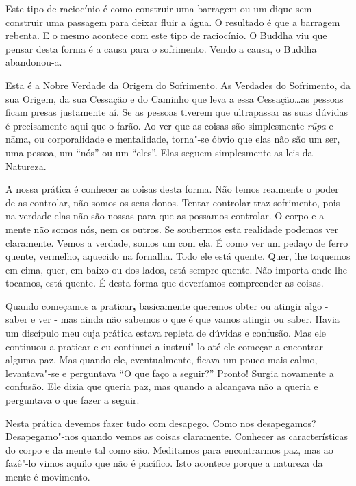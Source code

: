 Este tipo de raciocínio é como construir uma barragem ou um dique sem
construir uma passagem para deixar fluir a água. O resultado é que a
barragem rebenta. E o mesmo acontece com este tipo de raciocínio. O
Buddha viu que pensar desta forma é a causa para o sofrimento. Vendo a
causa, o Buddha abandonou-a.

Esta é a Nobre Verdade da Origem do Sofrimento. As Verdades do
Sofrimento, da sua Origem, da sua Cessação e do Caminho que leva a essa
Cessação\ldots{}as pessoas ficam presas justamente aí. Se as pessoas
tiverem que ultrapassar as suas dúvidas é precisamente aqui que o farão.
Ao ver que as coisas são simplesmente \emph{rūpa} e nāma, ou
corporalidade e mentalidade, torna"-se óbvio que elas não são um ser, uma
pessoa, um ``nós'' ou um ``eles''. Elas seguem simplesmente as leis da
Natureza.

A nossa prática é conhecer as coisas desta forma. Não temos realmente o
poder de as controlar, não somos os seus donos. Tentar controlar traz
sofrimento, pois na verdade elas não são nossas para que as possamos
controlar. O corpo e a mente não somos nós, nem os outros. Se soubermos
esta realidade podemos ver claramente. Vemos a verdade, somos um com
ela. É como ver um pedaço de ferro quente, vermelho, aquecido na
fornalha. Todo ele está quente. Quer, lhe toquemos em cima, quer, em
baixo ou dos lados, está sempre quente. Não importa onde lhe tocamos,
está quente. É desta forma que deveríamos compreender as coisas.

Quando começamos a praticar\textbf{,} basicamente queremos obter ou
atingir algo - saber e ver - mas ainda não sabemos o que é que vamos
atingir ou saber. Havia um discípulo meu cuja prática estava repleta de
dúvidas e confusão. Mas ele continuou a praticar e eu continuei a
instruí"-lo até ele começar a encontrar alguma paz. Mas quando ele,
eventualmente, ficava um pouco mais calmo, levantava"-se e perguntava ``O
que faço a seguir?'' Pronto! Surgia novamente a confusão. Ele dizia que
queria paz, mas quando a alcançava não a queria e perguntava o que fazer
a seguir.

Nesta prática devemos fazer tudo com desapego. Como nos desapegamos?
Desapegamo"-nos quando vemos as coisas claramente. Conhecer as
características do corpo e da mente tal como são. Meditamos para
encontrarmos paz, mas ao fazê"-lo vimos aquilo que não é pacífico. Isto
acontece porque a natureza da mente é movimento.

